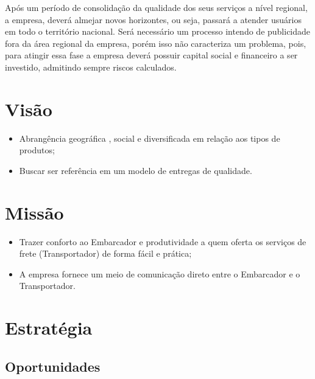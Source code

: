 		Após um período de consolidação da qualidade dos seus serviços a nível regional, a empresa, deverá almejar novos horizontes, ou seja, passará a atender usuários em todo o território nacional. Será necessário um processo intendo de publicidade fora da área regional da empresa, porém isso não caracteriza um problema, pois, para atingir essa fase a empresa deverá possuir capital social e financeiro a ser investido, admitindo sempre riscos calculados.

	\section{Visão}
	
		\begin{itemize}
			
			\item Abrangência geográfica , social e diversificada em relação aos tipos de produtos;
			
			\item Buscar ser referência em um modelo de entregas de qualidade.
			
		\end{itemize}

	\section{Missão}
	
		\begin{itemize}
			
			\item Trazer conforto ao Embarcador e produtividade a
			quem oferta os serviços de frete (Transportador)
			de forma fácil e prática;
			
			\item A empresa fornece um meio de comunicação
			direto entre o Embarcador e o Transportador.
			
		\end{itemize}

	\section{Estratégia}
	
	\subsection{Oportunidades}
	
